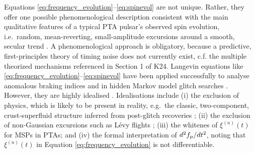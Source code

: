 \documentclass[fleqn,usenatbib,useAMS]{mnras}
\begin{document}
Equations \eqref{eq:frequency_evolution}--\eqref{eq:spinevol} are not unique. Rather, they offer one possible phenomenological description consistent with the main qualitative features of a typical PTA pulsar's observed spin evolution, i.e.\ random, mean-reverting, small-amplitude excursions around a smooth, secular trend \citep{NANOgrav2023,EPTA2023,Zic2023arXiv230616230Z}. A phenomenological approach is obligatory, because a predictive, first-principles theory of timing noise does not currently exist, c.f. the multiple theorized mechanisms referenced in Section 1 of K24. Langevin equations like \eqref{eq:frequency_evolution}--\eqref{eq:spinevol} have been applied successfully to analyse anomalous braking indices \citep{Vargas} and in hidden Markov model glitch searches \citep{Melatos2020ApJ...896...78M,Lower2021MNRAS.508.3251L,Dunn2022,Dunn2023MNRAS.522.5469D}. However, they are highly idealised \citep{Meyers2021,Myers2021MNRAS.502.3113M,2023MNRAS.520.2813A,Vargas}. Idealisations include (i) the exclusion of physics, which is likely to be present in reality, e.g.\ the classic, two-component, crust-superfluid structure inferred from post-glitch recoveries \citep{Baym1969,vanEysden,Alpar2017MNRAS.471.4827G,Myers2021MNRAS.502.3113M,Meyers2021}; (ii) the exclusion of non-Gaussian excursions such as L\'{e}vy flights \citep{Sornette2004}; (iii) the whitenes of $\xi^{(n)}(t)$ for MSPs in PTAs; and (iv) the formal interpretation of $d^2 f_{\rm p} / dt^2$, noting that $\xi^{(n)}(t)$ in Equation \eqref{eq:frequency_evolution} is not differentiable.
\end{document}
